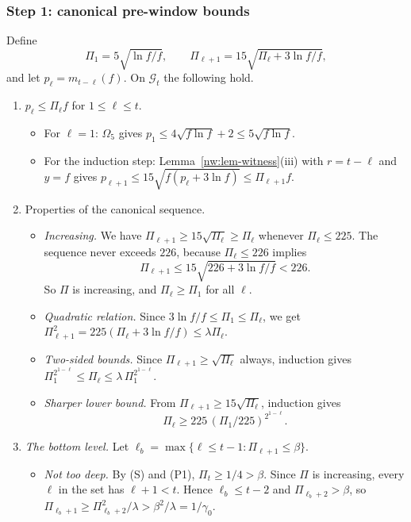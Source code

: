 \documentclass[11pt]{amsart}
\theoremstyle{definition}
\theoremstyle{remark}
\begin{document}
\subsubsection{Step 1: canonical pre-window bounds}
Define
\[
  \Pi_1=5\sqrt{\ln f/f},\qquad\Pi_{\ell+1}=15\sqrt{\Pi_\ell+3\ln f/f},
\]
and let $p_\ell=m_{t-\ell}(f)$. On $\mathcal G_t$ the following hold.
\begin{enumerate}[label=(P\arabic*),leftmargin=*]
\item $p_\ell\le\Pi_\ell f$ for $1\le\ell\le t$.
  \begin{itemize}
  \item For $\ell=1$: $\Omega_5$ gives
    $p_1\le4\sqrt{f\ln f}+2\le5\sqrt{f\ln f}$.
  \item For the induction step: Lemma~\ref{nw:lem-witness}(iii) with
    $r=t-\ell$ and $y=f$ gives
    $p_{\ell+1}\le15\sqrt{f(p_\ell+3\ln f)}\le\Pi_{\ell+1}f$.
  \end{itemize}
\item Properties of the canonical sequence.
  \begin{itemize}
  \item \emph{Increasing.} We have
    $\Pi_{\ell+1}\ge15\sqrt{\Pi_\ell}\ge\Pi_\ell$ whenever
    $\Pi_\ell\le225$. The sequence never exceeds $226$, because
    $\Pi_\ell\le226$ implies
    \[
      \Pi_{\ell+1}\le15\sqrt{226+3\ln f/f}<226.
    \]
    So $\Pi$ is increasing, and $\Pi_\ell\ge\Pi_1$ for all $\ell$.
  \item \emph{Quadratic relation.} Since $3\ln f/f\le\Pi_1\le\Pi_\ell$, we get
    $\Pi_{\ell+1}^2=225(\Pi_\ell+3\ln f/f)\le\lambda\Pi_\ell$.
  \item \emph{Two-sided bounds.} Since $\Pi_{\ell+1}\ge\sqrt{\Pi_\ell}$
    always, induction gives
    $\Pi_1^{2^{1-\ell}}\le\Pi_\ell\le\lambda\,\Pi_1^{2^{1-\ell}}$.
  \item \emph{Sharper lower bound.} From
    $\Pi_{\ell+1}\ge15\sqrt{\Pi_\ell}$, induction gives
    \[
      \Pi_\ell\ge225\,(\Pi_1/225)^{2^{1-\ell}}.
    \]
  \end{itemize}
\item \emph{The bottom level.} Let
  $\ell_b=\max\{\ell\le t-1:\Pi_{\ell+1}\le\beta\}$.
  \begin{itemize}
  \item \emph{Not too deep.} By (S) and (P1), $\Pi_t\ge1/4>\beta$. Since $\Pi$
    is increasing, every $\ell$ in the set has $\ell+1<t$. Hence
    $\ell_b\le t-2$ and $\Pi_{\ell_b+2}>\beta$, so
    $\Pi_{\ell_b+1}\ge\Pi_{\ell_b+2}^2/\lambda>\beta^2/\lambda=1/\gamma_0$.

\end{itemize}
\end{enumerate}
\end{document}
